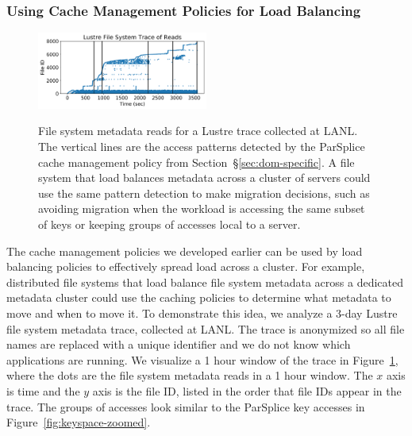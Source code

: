 \subsubsection{Using Cache Management Policies for Load Balancing}

\begin{figure}[t]
\noindent\includegraphics[width=0.5\textwidth]{./chapters/controlplane/parsplice/figures/trace-atime.png}\\
\caption{File system metadata reads for a Lustre trace collected at LANL. The
vertical lines are the access patterns detected by the ParSplice cache
management policy from Section~\S\ref{sec:dom-specific}. A file system that
load balances metadata across a cluster of servers could use the same pattern
detection to make migration decisions, such as avoiding migration when the
workload is accessing the same subset of keys or keeping groups of accesses
local to a server.  \label{fig:trace-atime}}
\end{figure}


The cache management policies we developed earlier can be used by load
balancing policies to effectively spread load across a cluster. For example,
distributed file systems that load balance file system metadata across a
dedicated metadata cluster could use the caching policies to determine what
metadata to move and when to move it.  To demonstrate this idea, we analyze a
3-day Lustre file system metadata trace, collected at LANL.  The trace is
anonymized so all file names are replaced with a unique identifier and we do
not know which applications are running. We visualize a 1 hour window of the
trace in Figure~\ref{fig:trace-atime}, where the dots are the file system
metadata reads in a 1 hour window.  The \(x\) axis is time and the \(y\) axis
is the file ID, listed in the order that file IDs appear in the trace.  The
groups of accesses look similar to the ParSplice key accesses in
Figure~\ref{fig:keyspace-zoomed}. 

